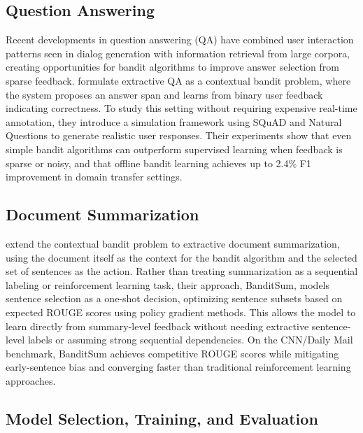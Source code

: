 \documentclass[11pt]{article}
\begin{document}
\subsection{Question Answering}

Recent developments in question answering (QA) have combined user interaction patterns seen in dialog generation with information retrieval from large corpora, creating opportunities for bandit algorithms to improve answer selection from sparse feedback. \citet{gao-etal-2022-simulating} formulate extractive QA as a contextual bandit problem, where the system proposes an answer span and learns from binary user feedback indicating correctness. To study this setting without requiring expensive real-time annotation, they introduce a simulation framework using SQuAD and Natural Questions to generate realistic user responses. Their experiments show that even simple bandit algorithms can outperform supervised learning when feedback is sparse or noisy, and that offline bandit learning achieves up to 2.4\% F1 improvement in domain transfer settings.

\subsection{Document Summarization}

\citet{dong-etal-2018-banditsum} extend the contextual bandit problem to extractive document summarization, using the document itself as the context for the bandit algorithm and the selected set of sentences as the action. Rather than treating summarization as a sequential labeling or reinforcement learning task, their approach, BanditSum, models sentence selection as a one-shot decision, optimizing sentence subsets based on expected ROUGE scores using policy gradient methods. This allows the model to learn directly from summary-level feedback without needing extractive sentence-level labels or assuming strong sequential dependencies. On the CNN/Daily Mail benchmark, BanditSum achieves competitive ROUGE scores while mitigating early-sentence bias and converging faster than traditional reinforcement learning approaches.

\subsection{Model Selection, Training, and Evaluation}
\end{document}
